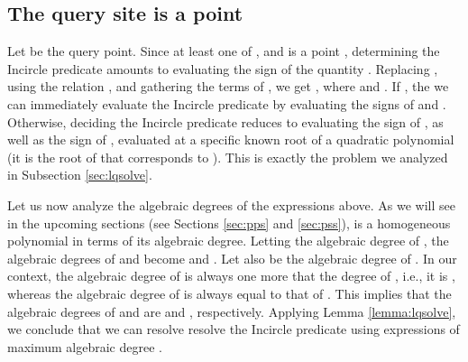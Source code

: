\documentclass[letterpaper,11pt]{article}
\newcommand{\incircle}{\textsf{Incircle}\xspace}
\newcommand{\pps}{\xspace}
\newcommand{\pss}{\xspace}
\newtheorem{lemma}[theorem]{Lemma}
\begin{document}
{\subsection{The query site is a point}\label{sec:pxsp}

Let  be the query point. Since at least one of ,  and
 is a point , determining the \incircle predicate amounts to
evaluating the sign of the quantity
.
Replacing , using the relation
, and gathering
the terms of , we get
, where
 and
.
If , the we can immediately evaluate the \incircle predicate by
evaluating the signs of  and . Otherwise, deciding the
\incircle predicate reduces to evaluating the sign of , as well
as the sign of , evaluated at a specific known root of a
quadratic polynomial  (it is the root of 
that corresponds to ). This is exactly the problem we analyzed in
Subsection \ref{sec:lqsolve}.

\begin{comment}
with roots  (this happens in the
\pps and \pss cases), evaluating the sign
of  amounts to evaluating the signs of  and
, where .
If , we have
, otherwise, if 
(resp., ), we have to check the sign of
. 
If , we get 
(resp. ), while if , we get
 (resp. ).  

The signs of  and  are equal to

and 

\end{comment}

Let us now analyze the algebraic degrees of the expressions above. As
we will see in the upcoming sections (see Sections \ref{sec:pps} and
\ref{sec:pss}),  is a homogeneous polynomial in terms of its
algebraic degree. Letting  the algebraic degree of ,
the algebraic degrees of  and  become  and
. Let also  be the algebraic degree of
. In our context, the algebraic degree of  is
always one more that the degree of , i.e., it is
, whereas the algebraic degree of  is always
equal to that of . This implies that the algebraic
degrees of  and  are  and
, respectively. Applying Lemma \ref{lemma:lqsolve}, we
conclude that we can resolve resolve the \incircle predicate using
expressions of maximum algebraic degree
.

\begin{comment}
Hence, the 
algebraic degree of the quantity  is
. Similarly, the
algebraic degree of the quantity  is
. Since the algebraic
degree of  is always greater or equal
to that of , we conclude the following:

\begin{lemma}\label{incircle:xxxp}
  Answering the  predicate, when at least
  one of the sites ,  or  is a point, amounts to
  computing the sign of a polynomial expressions of algebraic degree
  at most .
\end{lemma}
\end{comment}

}
\end{document}
